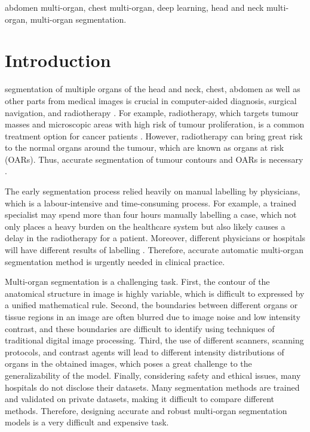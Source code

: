 \documentclass[lettersize,journal]{IEEEtran}
\begin{document}
\begin{IEEEkeywords}
abdomen multi-organ, chest multi-organ, deep learning, head and neck multi-organ, multi-organ segmentation.
\end{IEEEkeywords}

\section{Introduction}
 segmentation of multiple organs of the head and neck, chest, abdomen as well as other parts from medical images is crucial in computer-aided diagnosis, surgical navigation, and radiotherapy \cite{1,2}. For example, radiotherapy, which targets tumour masses and microscopic areas with high risk of tumour proliferation, is a common treatment option for cancer patients \cite{3}. However, radiotherapy can bring great risk to the normal organs around the tumour, which are known as organs at risk (OARs). Thus, accurate segmentation of tumour contours and OARs is necessary \cite{4,5}.

The early segmentation process relied heavily on manual labelling by physicians, which is a labour-intensive and time-consuming process. For example, a trained specialist may spend more than four hours manually labelling a case, which not only places a heavy burden on the healthcare system but also likely causes a delay in the radiotherapy for a patient. Moreover, different physicians or hospitals will have different results of labelling \cite{6,7,8,9}. Therefore, accurate automatic multi-organ segmentation method is urgently needed in clinical practice.

Multi-organ segmentation is a challenging task. First, the contour of the anatomical structure in image is highly variable, which is difficult to expressed by a unified mathematical rule. Second, the boundaries between different organs or tissue regions in an image are often blurred due to image noise and low intensity contrast, and these boundaries are difficult to identify using techniques of traditional digital image processing. Third, the use of different scanners, scanning protocols, and contrast agents will lead to different intensity distributions of organs in the obtained images, which poses a great challenge to the generalizability of the model. Finally, considering safety and ethical issues, many hospitals do not disclose their datasets. Many segmentation methods are trained and validated on private datasets, making it difficult to compare different methods. Therefore, designing accurate and robust multi-organ segmentation models is a very difficult and expensive task.
\end{document}
